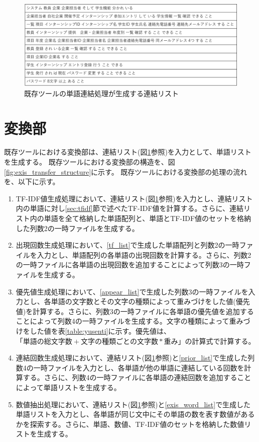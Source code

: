 \begin{figure}[tp]
    \begin{center}
        \includegraphics[width=1.0\columnwidth]{image/exis_connect_list.png}
        \caption{既存ツールの単語連結処理が生成する連結リスト}
        \label{fig:exis_connect_list}
    \end{center}
\end{figure}

\section{変換部}
\label{sec:exis_transfer}
既存ツールにおける変換部は、連結リスト(図\ref{fig:exis_connect_list}参照)を入力として、単語リストを生成する。
既存ツールにおける変換部の構造を、図\ref{fig:exis_transfer_structure}に示す。
既存ツールにおける変換部の処理の流れを、以下に示す。

\begin{enumerate}
    \item TF-IDF値生成処理において、連結リスト(図\ref{fig:exis_connect_list}参照)を入力とし、連結リスト内の単語に対し\ref{sec:tfidf}節で述べたTF-IDF値を計算する。さらに、連結リスト内の単語を全て格納した単語配列と、単語とTF-IDF値のセットを格納した列数2の一時ファイルを生成する。
    \label{tf_list}
    \item 出現回数生成処理において、\ref{tf_list}で生成した単語配列と列数2の一時ファイルを入力とし、単語配列の各単語の出現回数を計算する。さらに、列数2の一時ファイルに各単語の出現回数を追加することによって列数3の一時ファイルを生成する。
    \label{appear_list}
    \item 優先値生成処理において、\ref{appear_list}で生成した列数3の一時ファイルを入力とし、各単語の文字数とその文字の種類によって重みづけをした値(優先値)を計算する。さらに、列数3の一時ファイルに各単語の優先値を追加することによって列数4の一時ファイルを生成する。文字の種類によって重みづけをした値を表\ref{table:yusenti}に示す。優先値は、$「単語の総文字数 + 文字の種類ごとの文字数 * 重み」$の計算式で計算する。
    \label{prior_list}
    \item 連結回数生成処理において、連結リスト(図\ref{fig:exis_connect_list}参照)と\ref{prior_list}で生成した列数4の一時ファイルを入力とし、各単語が他の単語に連結している回数を計算する。さらに、列数4の一時ファイルに各単語の連結回数を追加することによって単語リストを生成する。
    \label{exis_word_list}
    \item 数値抽出処理において、連結リスト(図\ref{fig:exis_connect_list}参照)と\ref{exis_word_list}で生成した単語リストを入力とし、各単語が同じ文中にその単語の数を表す数値があるかを探索する。さらに、単語、数値、TF-IDF値のセットを格納した数値リストを生成する。
\end{enumerate}

